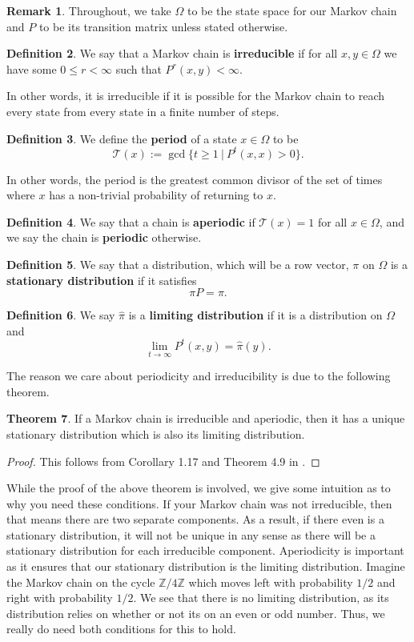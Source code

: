 \documentclass[10pt,a4paper]{amsart}
\theoremstyle{definition}
\newtheorem{definition}{Definition}
\numberwithin{definition}{section}
\newtheorem{remark}[definition]{Remark}
\newtheorem{theorem}[definition]{Theorem}
\begin{document}
\begin{remark}
Throughout, we take $\Omega$ to be the state space for our Markov chain and $P$ to be its transition matrix unless stated otherwise.
\end{remark}

\begin{definition}
We say that a Markov chain is \textbf{irreducible} if for all $x, y \in \Omega$ we have some $0 \leq r < \infty$ such that $P^r(x,y) < \infty$. 
\end{definition}
\noindent In other words, it is irreducible if it is possible for the Markov chain to reach every state from every state in a finite number of steps. 
\begin{definition}
We define the \textbf{period} of a state $x \in \Omega$ to be 
\[ \mathscr{T}(x) := \gcd \{t \geq 1 \ | \ P^t(x,x) > 0  \}. \]
\end{definition}
\noindent In other words, the period is the greatest common divisor of the set of times where $x$ has a non-trivial probability of returning to $x$. 
\begin{definition}
We say that a chain is \textbf{aperiodic} if $\mathscr{T}(x) = 1$ for all $x \in \Omega$, and we say the chain is \textbf{periodic} otherwise. 
\end{definition}
\begin{definition}
We say that a distribution, which will be a row vector, $\pi$ on $\Omega$ is a \textbf{stationary distribution} if it satisfies 
\[ \pi P = \pi. \]
\end{definition}
\begin{definition}
We say $\hat{\pi}$ is a \textbf{limiting distribution} if it is a distribution on $\Omega$ and 
\[ \lim_{t \rightarrow \infty} P^t(x,y) = \hat{\pi}(y). \]
\end{definition}
The reason we care about periodicity and irreducibility is due to the following theorem.

\begin{theorem}\label{thm:1}
If a Markov chain is irreducible and aperiodic, then it has a unique stationary distribution which is also its limiting distribution.
\end{theorem}

\begin{proof}
This follows from Corollary 1.17 and Theorem 4.9 in \cite{LevinPeresWilmer2006}.
\end{proof}

While the proof of the above theorem is involved, we give some intuition as to why you need these conditions. If your Markov chain was not irreducible, then that means there are two separate components. As a result, if there even is a stationary distribution, it will not be unique in any sense as there will be a stationary distribution for each irreducible component. Aperiodicity is important as it ensures that our stationary distribution is the limiting distribution. Imagine the Markov chain on the cycle $\mathbb{Z}/4\mathbb{Z}$ which moves left with probability $1/2$ and right with probability $1/2$. We see that there is no limiting distribution, as its distribution relies on whether or not its on an even or odd number. Thus, we really do need both conditions for this to hold.
\end{document}

